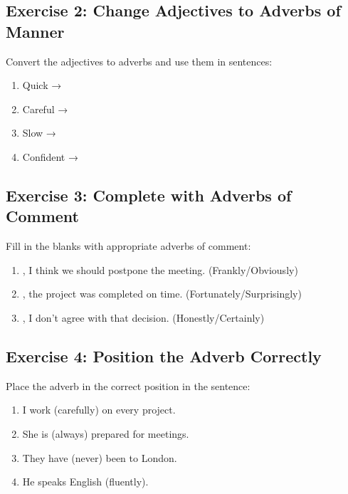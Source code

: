 \subsection{Exercise 2: Change Adjectives to Adverbs of Manner}
Convert the adjectives to adverbs and use them in sentences:

\begin{enumerate}
    \item Quick → \underline{\hspace{4cm}}
    \item Careful → \underline{\hspace{4cm}}
    \item Slow → \underline{\hspace{4cm}}
    \item Confident → \underline{\hspace{4cm}}
\end{enumerate}

\subsection{Exercise 3: Complete with Adverbs of Comment}
Fill in the blanks with appropriate adverbs of comment:

\begin{enumerate}
    \item \underline{\hspace{2cm}}, I think we should postpone the meeting. (Frankly/Obviously)
    \item \underline{\hspace{2cm}}, the project was completed on time. (Fortunately/Surprisingly)
    \item \underline{\hspace{2cm}}, I don't agree with that decision. (Honestly/Certainly)
\end{enumerate}

\subsection{Exercise 4: Position the Adverb Correctly}
Place the adverb in the correct position in the sentence:

\begin{enumerate}
    \item I work (carefully) on every project.
    \item She is (always) prepared for meetings.
    \item They have (never) been to London.
    \item He speaks English (fluently).
\end{enumerate}

